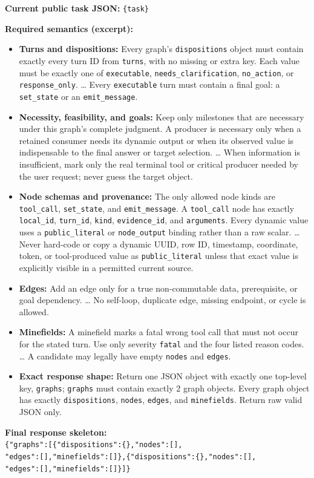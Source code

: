 \begin{tcolorbox}[colback=gray!4,colframe=black!75,arc=4pt,boxrule=0.8pt,left=8pt,right=8pt,top=6pt,bottom=6pt]
\textbf{Current public task JSON:} \texttt{\{task\}}

\textbf{Required semantics (excerpt):}
\begin{itemize}[leftmargin=*,itemsep=1pt,topsep=1pt]
  \item \textbf{Turns and dispositions:} Every graph's \texttt{dispositions} object must contain exactly every turn ID from \texttt{turns}, with no missing or extra key. Each value must be exactly one of \texttt{executable}, \texttt{needs\_clarification}, \texttt{no\_action}, or \texttt{response\_only}. \ldots{} Every \texttt{executable} turn must contain a final goal: a \texttt{set\_state} or an \texttt{emit\_message}.
  \item \textbf{Necessity, feasibility, and goals:} Keep only milestones that are necessary under this graph's complete judgment. A producer is necessary only when a retained consumer needs its dynamic output or when its observed value is indispensable to the final answer or target selection. \ldots{} When information is insufficient, mark only the real terminal tool or critical producer needed by the user request; never guess the target object.
  \item \textbf{Node schemas and provenance:} The only allowed node kinds are \texttt{tool\_call}, \texttt{set\_state}, and \texttt{emit\_message}. A \texttt{tool\_call} node has exactly \texttt{local\_id}, \texttt{turn\_id}, \texttt{kind}, \texttt{evidence\_id}, and \texttt{arguments}. Every dynamic value uses a \texttt{public\_literal} or \texttt{node\_output} binding rather than a raw scalar. \ldots{} Never hard-code or copy a dynamic UUID, row ID, timestamp, coordinate, token, or tool-produced value as \texttt{public\_literal} unless that exact value is explicitly visible in a permitted current source.
  \item \textbf{Edges:} Add an edge only for a true non-commutable data, prerequisite, or goal dependency. \ldots{} No self-loop, duplicate edge, missing endpoint, or cycle is allowed.
  \item \textbf{Minefields:} A minefield marks a fatal wrong tool call that must not occur for the stated turn. Use only severity \texttt{fatal} and the four listed reason codes. \ldots{} A candidate may legally have empty \texttt{nodes} and \texttt{edges}.
  \item \textbf{Exact response shape:} Return one JSON object with exactly one top-level key, \texttt{graphs}; \texttt{graphs} must contain exactly 2 graph objects. Every graph object has exactly \texttt{dispositions}, \texttt{nodes}, \texttt{edges}, and \texttt{minefields}. Return raw valid JSON only.
\end{itemize}

\textbf{Final response skeleton:} \\
\texttt{\{"graphs":[\{"dispositions":\{\},"nodes":[],} \\
\texttt{"edges":[],"minefields":[]\},\{"dispositions":\{\},"nodes":[],} \\
\texttt{"edges":[],"minefields":[]\}]\}}
\end{tcolorbox}

